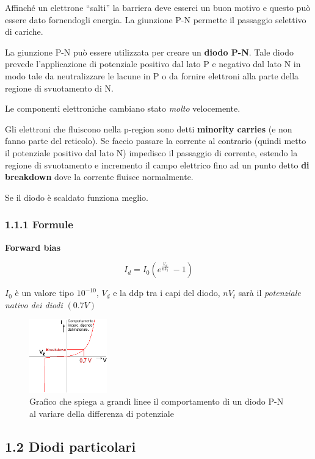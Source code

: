 \documentclass[
]{article}
\begin{document}
Affinché un elettrone ``salti'' la barriera deve esserci un buon motivo
e questo può essere dato fornendogli energia. La giunzione P-N permette
il passaggio selettivo di cariche.

La giunzione P-N può essere utilizzata per creare un \textbf{diodo P-N}.
Tale diodo prevede l'applicazione di potenziale positivo dal lato P e
negativo dal lato N in modo tale da neutralizzare le lacune in P o da
fornire elettroni alla parte della regione di svuotamento di N.

Le componenti elettroniche cambiano stato \emph{molto} velocemente.

Gli elettroni che fluiscono nella p-region sono detti \textbf{minority
carries} (e non fanno parte del reticolo). Se faccio passare la corrente
al contrario (quindi metto il potenziale positivo dal lato N) impedisco
il passaggio di corrente, estendo la regione di svuotamento e incremento
il campo elettrico fino ad un punto detto \textbf{di breakdown} dove la
corrente fluisce normalmente.

Se il diodo è scaldato funziona meglio.

\subsubsection{1.1.1 Formule}\label{formule}

\textbf{Forward bias}

\[I_{d}=I_{0}(e^{\frac{V_{d}}{nV_{t}}}\ -1)\]

\(I_{0}\) è un valore tipo \(10^{-10}\), \(V_{d}\) e la ddp tra i capi
del diodo, \(nV_{t}\) sarà il \emph{potenziale nativo dei diodi}
\((0.7V)\)

\begin{figure}
\centering
\includegraphics[width=0.3\textwidth,height=\textheight]{immagini/3.png}
\caption{Grafico che spiega a grandi linee il comportamento di un diodo
P-N al variare della differenza di potenziale}
\end{figure}

\subsection{1.2 Diodi particolari}\label{diodi-particolari}
\end{document}
